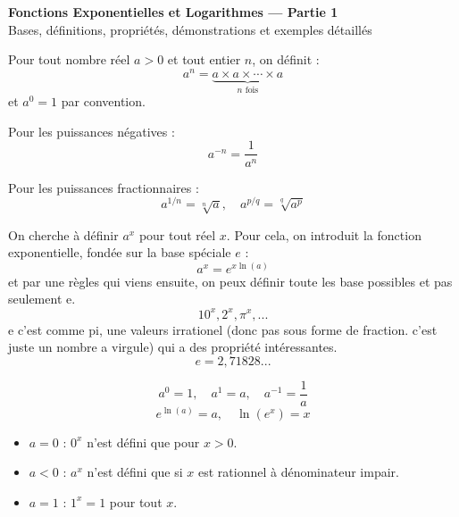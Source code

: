 \documentclass[11pt,a4paper]{article}
\newcommand{\rulebox}[3]{
\begin{tcolorbox}[colback=#1!10!white,colframe=#1!60!black,title=\textbf{#2}]
#3
\end{tcolorbox}
}
\begin{document}
\begin{center}
{\LARGE \textbf{Fonctions Exponentielles et Logarithmes — Partie 1}}\\[0.5cm]
{\large Bases, définitions, propriétés, démonstrations et exemples détaillés}
\end{center}

\rulebox{orange}{1. Rappel sur la puissance}{
Pour tout nombre réel $a>0$ et tout entier $n$, on définit :
\[
a^n = \underbrace{a\times a\times \cdots \times a}_{n\text{ fois}}
\]
et $a^0=1$ par convention.

Pour les puissances négatives :
\[
a^{-n} = \frac{1}{a^n}
\]

Pour les puissances fractionnaires :
\[
a^{1/n} = \sqrt[n]{a}, \quad a^{p/q} = \sqrt[q]{a^p}
\]
}

\rulebox{orange}{2. Généralisation aux puissances réelles}{
On cherche à définir $a^x$ pour tout réel $x$.  
Pour cela, on introduit la fonction exponentielle, fondée sur la base spéciale $e$ :
\[
a^x = e^{x\ln(a)}
\]
et par une règles qui viens ensuite, on peux définir toute les base possibles et pas seulement e.
\[
10^x, 2^x, \pi^x, ...
\]
e c'est comme pi, une valeurs irrationel (donc pas sous forme de fraction. c'est juste un nombre a virgule) qui a des propriété intéressantes.
\[
e = 2,71828...
\]

}

\rulebox{gray}{3. Valeurs particulières}{
\[
a^0 = 1, \quad a^1 = a, \quad a^{-1} = \frac{1}{a}
\]
\[
e^{\ln(a)} = a, \quad \ln(e^x) = x
\]
}

\rulebox{red}{4. Cas particuliers et interdits}{
\begin{itemize}
\item $a=0$ : $0^x$ n’est défini que pour $x>0$.
\item $a<0$ : $a^x$ n’est défini que si $x$ est rationnel à dénominateur impair.
\item $a=1$ : $1^x=1$ pour tout $x$.
\end{itemize}
}
\end{document}

